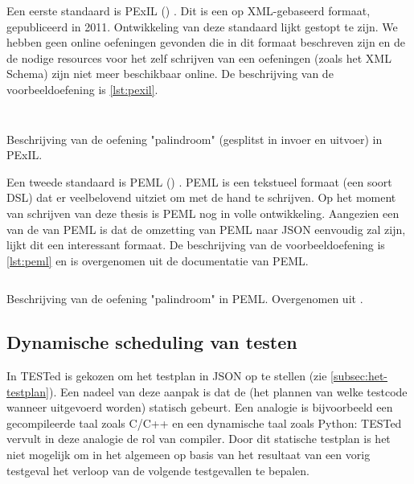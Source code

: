 Een eerste standaard is PExIL () \autocite{queiros2011pexil}.
Dit is een op XML-gebaseerd formaat, gepubliceerd in 2011.
Ontwikkeling van deze standaard lijkt gestopt te zijn.
We hebben geen online oefeningen gevonden die in dit formaat beschreven zijn en de de nodige resources voor het zelf schrijven van een oefeningen (zoals het XML Schema) zijn niet meer beschikbaar online.
De beschrijving van de voorbeeldoefening is \cref{lst:pexil}.

\begin{listing}
    \inputminted{xml}{code/pexil-in.xml}
    \inputminted{xml}{code/pexil-out.xml}
    \caption{Beschrijving van de oefening "palindroom" (gesplitst in invoer en uitvoer) in PExIL.}
    \label{lst:pexil}
\end{listing}

Een tweede standaard is PEML () \autocite{peml}.
PEML is een tekstueel formaat (een soort DSL) dat er veelbelovend uitziet om met de hand te schrijven.
Op het moment van schrijven van deze thesis is PEML nog in volle ontwikkeling.
Aangezien een van de  van PEML is dat de omzetting van PEML naar JSON eenvoudig zal zijn, lijkt dit een interessant formaat.
De beschrijving van de voorbeeldoefening is \cref{lst:peml} en is overgenomen uit de documentatie van PEML.

\begin{listing}
    \inputminted{yaml}{code/peml.peml}
    \caption{
        Beschrijving van de oefening "palindroom" in PEML.
        Overgenomen uit \autocite{peml}.
    }
    \label{lst:peml}
\end{listing}


\subsection{Dynamische scheduling van testen}\label{subsec:dynamische-scheduling-van-testen}

In TESTed is gekozen om het testplan in JSON op te stellen (zie \cref{subsec:het-testplan}).
Een nadeel van deze aanpak is dat de  (het plannen van welke testcode wanneer uitgevoerd worden) statisch gebeurt.
Een analogie is bijvoorbeeld een gecompileerde taal zoals C/C++ en een dynamische taal zoals Python: TESTed vervult in deze analogie de rol van compiler.
Door dit statische testplan is het niet mogelijk om in het algemeen op basis van het resultaat van een vorig testgeval het verloop van de volgende testgevallen te bepalen.

